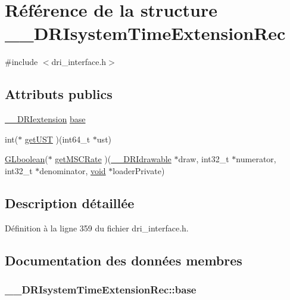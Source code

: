 \hypertarget{struct_____d_r_isystem_time_extension_rec}{\section{Référence de la structure \-\_\-\-\_\-\-D\-R\-Isystem\-Time\-Extension\-Rec}
\label{struct_____d_r_isystem_time_extension_rec}
}


{\ttfamily \#include $<$dri\-\_\-interface.\-h$>$}

\subsection*{Attributs publics}
\begin{DoxyCompactItemize}
\item 
\hyperlink{dri__interface_8h_a4e0a61c8ece00d2b2c6792a9a1b55385}{\-\_\-\-\_\-\-D\-R\-Iextension} \hyperlink{struct_____d_r_isystem_time_extension_rec_a973aab16eb6c4fe9ed24d1dc27010fa4}{base}
\item 
int($\ast$ \hyperlink{struct_____d_r_isystem_time_extension_rec_aa5e564ab6277874da231d42c26aeb057}{get\-U\-S\-T} )(int64\-\_\-t $\ast$ust)
\item 
\hyperlink{gl_8h_aea1419aa8aec5854bd9807b45171029d}{G\-Lboolean}($\ast$ \hyperlink{struct_____d_r_isystem_time_extension_rec_a721fc69d9d78768ad190b10d16f9e15c}{get\-M\-S\-C\-Rate} )(\hyperlink{dri__interface_8h_a5bfb832a0a08208d95b3bbef439d2262}{\-\_\-\-\_\-\-D\-R\-Idrawable} $\ast$draw, int32\-\_\-t $\ast$numerator, int32\-\_\-t $\ast$denominator, \hyperlink{glu_8h_a4292190e3f1f6b373a760c7d9316ad3c}{void} $\ast$loader\-Private)
\end{DoxyCompactItemize}


\subsection{Description détaillée}


Définition à la ligne 359 du fichier dri\-\_\-interface.\-h.



\subsection{Documentation des données membres}
\hypertarget{struct_____d_r_isystem_time_extension_rec_a973aab16eb6c4fe9ed24d1dc27010fa4}{
\subsubsection[{base}]{ \-\_\-\-\_\-\-D\-R\-Isystem\-Time\-Extension\-Rec\-::base}}\label{struct_____d_r_isystem_time_extension_rec_a973aab16eb6c4fe9ed24d1dc27010fa4}


